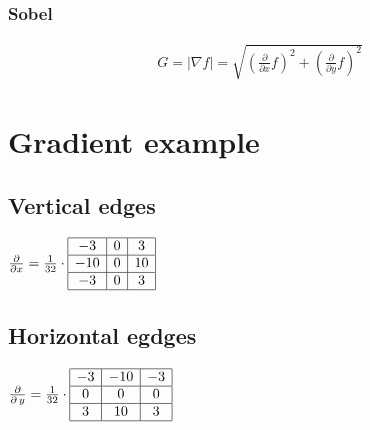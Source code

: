 \documentclass[letterpaper,10pt,english]{sphinxmanual}
\begin{document}
\subsubsection{Sobel}
\label{\detokenize{02-ImageEnhancement:sobel}}\begin{equation*}
\begin{split}
G=|\nabla f|=\sqrt{\left(\frac{\partial}{\partial x}f\right)^2 + \left(\frac{\partial}{\partial y}f\right)^2}
\end{split}
\end{equation*}

\section{Gradient example}
\label{\detokenize{02-ImageEnhancement:gradient-example}}

\subsection{Vertical edges}
\label{\detokenize{02-ImageEnhancement:vertical-edges}}
\sphinxAtStartPar
\(\frac{\partial}{\partial x}=\frac{1}{32}\cdot\begin{array}{|c|c|c|}
\hline
-3 & 0 & 3\\
\hline
-10 & 0 & 10\\
\hline
-3 & 0 & 3\\
\hline
\end{array}\)


\subsection{Horizontal egdges}
\label{\detokenize{02-ImageEnhancement:horizontal-egdges}}
\sphinxAtStartPar
\(\frac{\partial}{\partial\,y}=\frac{1}{32}\cdot\begin{array}{|c|c|c|}
\hline
-3 & -10 & -3\\
\hline
0 & 0 & 0\\
\hline
3 & 10 & 3\\
\hline
\end{array}\)

\sphinxAtStartPar
{}
\end{document}
